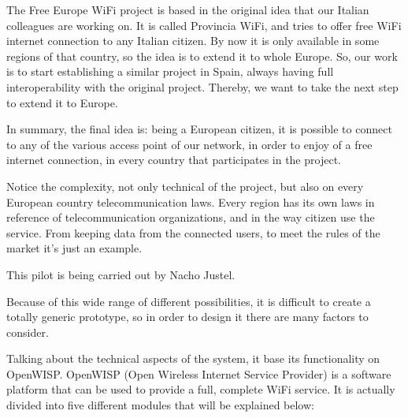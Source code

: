 \documentclass[draftclsnofoot,12pt,journal,onecolumn]{IEEEtran}
\begin{document}
The Free Europe WiFi project is based in the original idea that our Italian colleagues are working on. It is called Provincia WiFi, and tries to offer free WiFi internet connection to any Italian citizen. By now it is only available in some regions of that country, so the idea is to extend it to whole Europe. So, our work is to start establishing a similar project in Spain, always having full interoperability with the original project. Thereby, we want to take the next step to extend it to Europe.

In summary, the final idea is: being a European citizen, it is possible to connect to any of the various access point of our network, in order to enjoy of a free internet connection, in every country that participates in the project.

Notice the complexity, not only technical of the project, but also on every European country telecommunication laws. Every region has its own laws in reference of telecommunication organizations, and in the way citizen use the service. From keeping data from the connected users, to meet the rules of the market it's just an example.

This pilot is being carried out by Nacho Justel.

Because of this wide range of different possibilities, it is difficult to create a totally generic prototype, so in order to design it there are many factors to consider.

Talking about the technical aspects of the system, it base its functionality on OpenWISP. OpenWISP (Open Wireless Internet Service Provider) is a software platform that can be used to provide a full, complete WiFi service. It is actually divided into five different modules that will be explained below:
\end{document}
